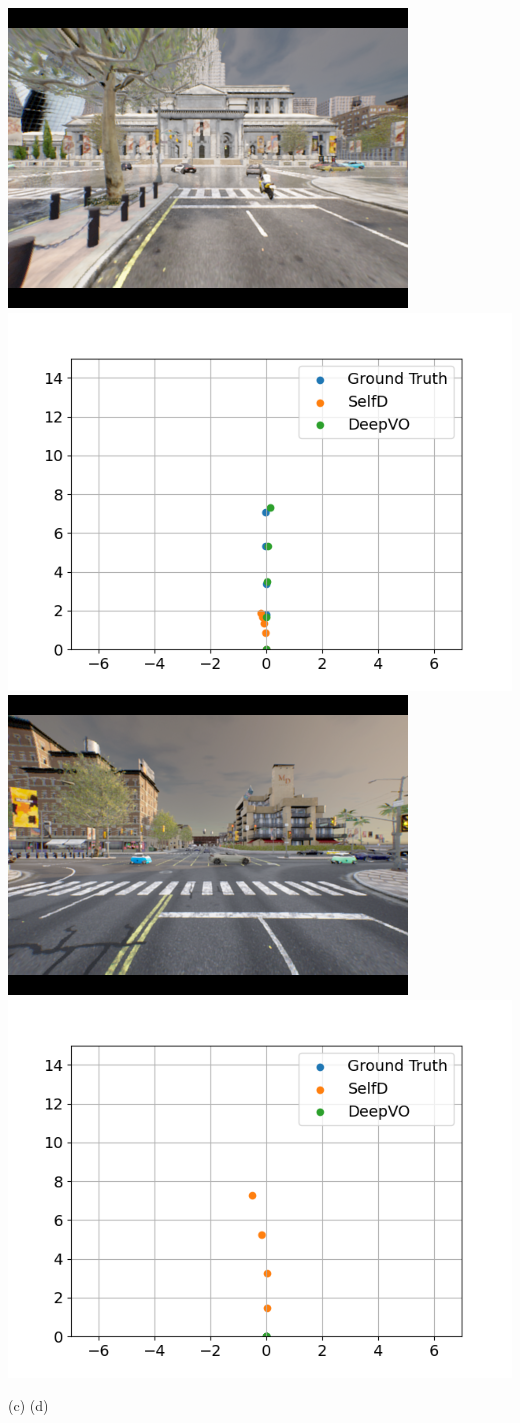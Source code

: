 \documentclass[letterpaper, 12pt]{book}
\theoremstyle{definition}
\theoremstyle{definition}
\theoremstyle{definition}
\theoremstyle{definition}
\theoremstyle{definition}
\begin{document}
{\begin{minipage}{\textwidth}
\begin{center}
\includegraphics[trim={1.5cm 0.75cm 1.5cm 0.75cm},clip,height=0.19\textwidth]{./img/compare/9.png}
\includegraphics[trim={1cm 0.5cm 1.5cm 1cm},clip,height=0.19\textwidth]{./img/compare/9_wp.png}
\hfill
\includegraphics[trim={1.5cm 0.75cm 1.5cm 0.75cm},clip,height=0.19\textwidth]{./img/compare/10.png}
\includegraphics[trim={1cm 0.5cm 1.5cm 1cm},clip,height=0.19\textwidth]{./img/compare/10_wp.png}

\hspace{0.19\textwidth} (c) \hfill (d) \hspace{0.19\textwidth}
\vspace{5pt}


\end{center}
\end{minipage}}
\end{document}
